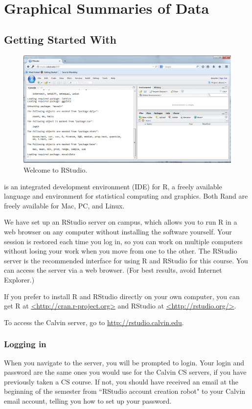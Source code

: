 \documentclass[twoside]{book}\usepackage[]{graphicx}\usepackage[]{xcolor}
\def\Chapter#1{%
\chapter{#1}
}
\def\R{{\sf R}}
\def\Rstudio{{\sf RStudio}}
\begin{document}
\Chapter{Graphical Summaries of Data}

\section{Getting Started With \RStudio}

\begin{figure}
\begin{center}
\includegraphics[width=.85\textwidth]{images/RStudio-Welcome2}
\end{center}
\caption{Welcome to \Rstudio.}
\label{fig:Rstudio-welcome}%
\end{figure}

\RStudio{} is an integrated development environment (IDE) for \R,  
a freely available language and environment for statistical computing and graphics.
Both \R and \RStudio{} are freely available for Mac, PC, and Linux.  

We have set up an RStudio server on campus, which allows you to run R in a web browser on any computer without installing the software yourself.  Your session is restored each time you log in, so you can work on multiple computers without losing your work when you move from one to the other.  The RStudio server is the recommended interface for using R and RStudio for this course. You can access the \RStudio{} server via a web browser.  (For best results, avoid 
Internet Explorer.)

If you prefer to install R and RStudio directly on your own computer, you can get R at \url{<http://cran.r-project.org>} and RStudio at \url{<http://rstudio.org/>}.    

To access the Calvin \RStudio{} server, go to \url{http://rstudio.calvin.edu}.

\subsection{Logging in}
When you navigate to the \RStudio{} server, you will be prompted to login.  
Your login and password are the same ones you would use for the Calvin CS servers, if you have previously taken a CS course. If not, you should have received an email at the beginning of the semester from ``RStudio account creation robot" to your Calvin email account, telling you how to set up your password.
\end{document}
